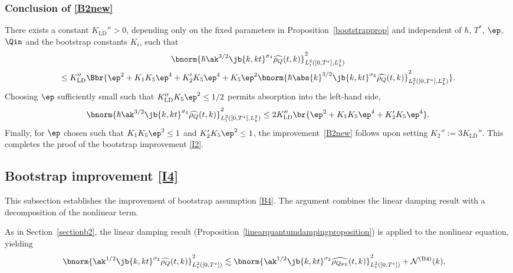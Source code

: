 \subsubsection{Conclusion of \eqref{B2new}}
There exists a constant $K_{\mathrm{LD}}''>0$, depending only on the fixed parameters in Proposition~\ref{bootstrapprop} and independent of $\hbar$, $T^*$, $\ep$, $\Qin$ and the bootstrap constants $K_i$, such that
\begin{multline*}
\bnorm{\hbar\ak^{3/2}\jb{k,kt}^{\sigma_4}\widehat{\rho_Q}(t,k)}_{L^2_{t}([0,T^*],L^2_k)}^2\\
\leq K_{\mathrm{LD}}''\Bbr{\ep^2+K_1K_5\ep^4+K_2'K_5\ep^4+K_5\ep^2\bnorm{\hbar\abs{k}^{3/2}\jb{k,kt}^{\sigma_4}\widehat{\rho_Q}(t,k)}_{L^2_{t}([0,T^*],L^2_k)}^2}.
\end{multline*}
Choosing $\ep$ sufficiently small such that $K_{\mathrm{LD}}'' K_5 \ep^2 \leq 1/2$ permits absorption into the left-hand side,
\begin{align*}
\bnorm{\hbar\ak^{3/2}\jb{k,kt}^{\sigma_4}\widehat{\rho_Q}(t,k)}_{L^2_{t}([0,T^*],L^2_k)}^2\leq 2K_{\mathrm{LD}}''\br{\ep^2+K_1K_5\ep^4+K_2'K_5\ep^4}.
\end{align*}
Finally, for $\ep$ chosen such that $K_1 K_5 \ep^2 \leq 1$ and $K_2' K_5 \ep^2 \leq 1$, the improvement~\eqref{B2new} follows upon setting $K_2'' := 3 K_{\mathrm{LD}}''$. This completes the proof of the bootstrap improvement \eqref{I2}.

\subsection{Bootstrap improvement \eqref{I4}}\label{sectionb4}
This subsection establishes the improvement of bootstrap assumption \eqref{B4}. The argument combines the linear damping result with a decomposition of the nonlinear term.

As in Section~\ref{sectionb2}, the linear damping result (Proposition~\ref{linearquantumdampingproposition}) is applied to the nonlinear equation, yielding
\begin{align*}
\bnorm{\ak^{1/2}\jb{k,kt}^{\sigma_2}\widehat{\rho_Q}(t,k)}_{L^2_{t}([0,T^*])}^2&\lesssim \bnorm{\ak^{1/2}\jb{k,kt}^{\sigma_2}\widehat{\rho_{{Q_{\mathrm{FS}}}}}(t,k)}_{L^2_{t}([0,T^*])}^2+\mathcal{N}^{\mathrm{(B4)}}(k),
\end{align*}

